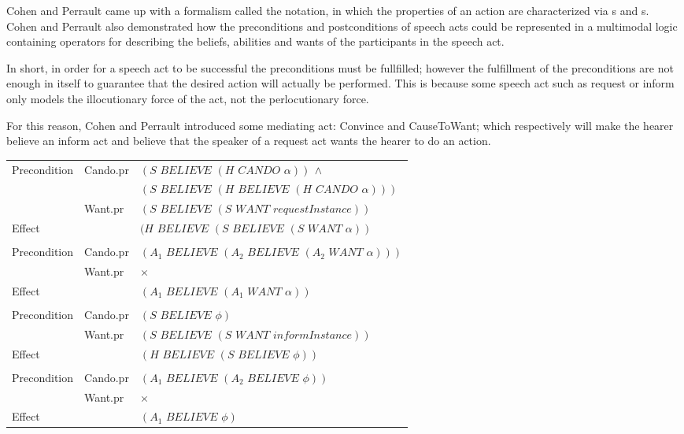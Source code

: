 Cohen and Perrault came up with a formalism called the  notation, in which the properties of an action are characterized via s and s.\\
Cohen and Perrault also demonstrated how the preconditions and postconditions of speech acts could be represented in a multimodal logic containing operators for describing the beliefs, abilities and wants of the participants in the speech act.

In short, in order for a speech act to be successful the preconditions must be fullfilled; however the fulfillment of the preconditions are not enough in itself to guarantee that the desired action will actually be performed. This is because some speech act such as request or inform only models the illocutionary force of the act, not the perlocutionary force.

For this reason, Cohen and Perrault introduced some mediating act: Convince and CauseToWant; which respectively will make the hearer believe an inform act and believe that the speaker of a request act wants the hearer to do an action.
\begin{table}[!h]
\centering
\begin{NiceTabular}{|lll|}
\hline
{}&&\\
\hline
Precondition& Cando.pr&$(S\,\,BELIEVE\,\,(H\,\,CANDO\,\,\alpha))\,\land$\\
&&$(S\,\,BELIEVE\,\,(H \,\,BELIEVE\,\,(H\,\,CANDO\,\,\alpha)))$\\
& Want.pr &$(S\,\,BELIEVE\,\,(S\,\,WANT\,\,requestInstance))$\\
Effect&&$(H\,\,BELIEVE\,\,(S\,\,BELIEVE\,\,(S\,\,WANT\,\,\alpha))$\\
\hline
{}&&\\
\hline
Precondition& Cando.pr&$(A_1\,\,BELIEVE\,\,(A_2 \,\,BELIEVE\,\,(A_2\,\,WANT\,\,\alpha)))$\\
& Want.pr &$\times$\\
Effect&&$(A_1\,\,BELIEVE\,\,(A_1\,\,WANT\,\,\alpha))$\\
\hline
{}&&\\
\hline
Precondition& Cando.pr&$(S\,\,BELIEVE\,\,\phi)$\\
& Want.pr &$(S\,\,BELIEVE\,\,(S\,\,WANT\,\,informInstance))$\\
Effect&&$(H\,\,BELIEVE\,\,(S\,\,BELIEVE\,\,\phi))$\\
\hline
{}&&\\
\hline
Precondition& Cando.pr&$(A_1\,\,BELIEVE\,\,(A_2\,\,BELIEVE\,\,\phi))$\\
& Want.pr &$\times$\\
Effect&&$(A_1\,\,BELIEVE\,\,\phi)$\\
\hline
\end{NiceTabular}
\end{table}

